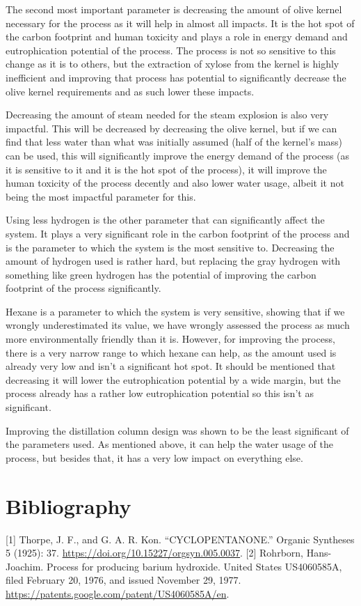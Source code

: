 \documentclass[11pt]{article}
\begin{document}
The second most important parameter is decreasing the amount of olive kernel necessary for the process as it will help in almost all impacts. It is the hot spot of the carbon footprint and human toxicity and plays a role in energy demand and eutrophication potential of the process. The process is not so sensitive to this change as it is to others, but the extraction of xylose from the kernel is highly inefficient and improving that process has potential to significantly decrease the olive kernel requirements and as such lower these impacts.

Decreasing the amount of steam needed for the steam explosion is also very impactful. This will be decreased by decreasing the olive kernel, but if we can find that less water than what was initially assumed (half of the kernel's mass) can be used, this will significantly improve the energy demand of the process (as it is sensitive to it and it is the hot spot of the process), it will improve the human toxicity of the process decently and also lower water usage, albeit it not being the most impactful parameter for this.

Using less hydrogen is the other parameter that can significantly affect the system. It plays a very significant role in the carbon footprint of the process and is the parameter to which the system is the most sensitive to. Decreasing the amount of hydrogen used is rather hard, but replacing the gray hydrogen with something like green hydrogen has the potential of improving the carbon footprint of the process significantly.

Hexane is a parameter to which the system is very sensitive, showing that if we wrongly underestimated its value, we have wrongly assessed the process as much more environmentally friendly than it is. However, for improving the process, there is a very narrow range to which hexane can help, as the amount used is already very low and isn't a significant hot spot. It should be mentioned that decreasing it will lower the eutrophication potential by a wide margin, but the process already has a rather low eutrophication potential so this isn't as significant.

Improving the distillation column design was shown to be the least significant of the parameters used. As mentioned above, it can help the water usage of the process, but besides that, it has a very low impact on everything else.

\section{Bibliography}
\label{sec:orgff54500}
[1] Thorpe, J. F., and G. A. R. Kon. “CYCLOPENTANONE.” Organic Syntheses 5 (1925): 37. \url{https://doi.org/10.15227/orgsyn.005.0037}.
[2] Rohrborn, Hans-Joachim. Process for producing barium hydroxide. United States US4060585A, filed February 20, 1976, and issued November 29, 1977. \url{https://patents.google.com/patent/US4060585A/en}.
\end{document}
